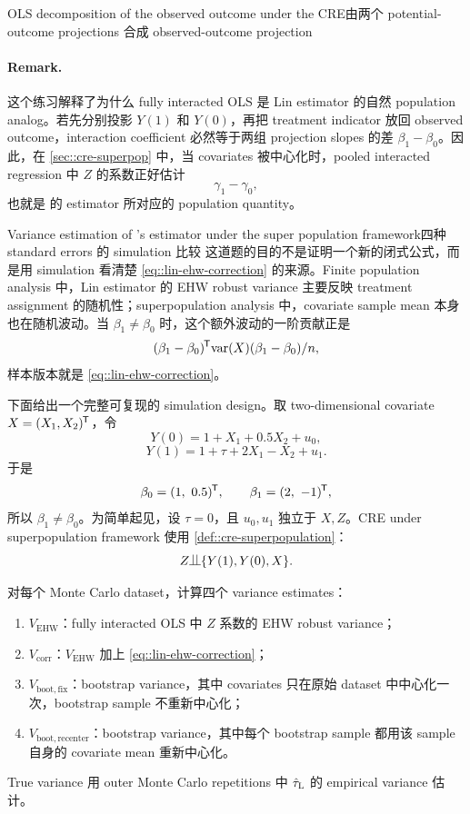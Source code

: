 \begin{exercisesolution}{OLS decomposition of the observed outcome under the CRE}{由两个 potential-outcome projections 合成 observed-outcome projection}
\paragraph{Remark.}
这个练习解释了为什么 fully interacted OLS 是 Lin estimator 的自然 population analog。若先分别投影 $Y(1)$ 和 $Y(0)$，再把 treatment indicator 放回 observed outcome，interaction coefficient 必然等于两组 projection slopes 的差 $\beta_1-\beta_0$。因此，在 \cref{sec::cre-superpop} 中，当 covariates 被中心化时，pooled interacted regression 中 $Z$ 的系数正好估计
\[
\gamma_1-\gamma_0,
\]
也就是 \citet{lin2013} 的 estimator 所对应的 population quantity。
\end{exercisesolution}

\begin{exercisesolution}{Variance estimation of \citet{lin2013}'s estimator under the super population framework}{四种 standard errors 的 simulation 比较}
这道题的目的不是证明一个新的闭式公式，而是用 simulation 看清楚 \cref{eq::lin-ehw-correction} 的来源。Finite population analysis 中，Lin estimator 的 EHW robust variance 主要反映 treatment assignment 的随机性；superpopulation analysis 中，covariate sample mean 本身也在随机波动。当 $\beta_1\neq\beta_0$ 时，这个额外波动的一阶贡献正是
\[
(\beta_1-\beta_0)^{\mkern-1.5mu\mathsf{T}}\text{var}(X)(\beta_1-\beta_0)/n,
\]
样本版本就是 \cref{eq::lin-ehw-correction}。

下面给出一个完整可复现的 simulation design。取 two-dimensional covariate $X=(X_1,X_2)^{\mkern-1.5mu\mathsf{T}}$，令
\[
Y(0)=1+X_1+0.5X_2+u_0,
\]
\[
Y(1)=1+\tau+2X_1-X_2+u_1.
\]
于是
\[
\beta_0=(1,\ 0.5)^{\mkern-1.5mu\mathsf{T}},\qquad
\beta_1=(2,\ -1)^{\mkern-1.5mu\mathsf{T}},
\]
所以 $\beta_1\neq\beta_0$。为简单起见，设 $\tau=0$，且 $u_0,u_1$ 独立于 $X,Z$。CRE under superpopulation framework 使用 \cref{def::cre-superpopulation}：
\[
Z\ind\{Y(1),Y(0),X\}.
\]

对每个 Monte Carlo dataset，计算四个 variance estimates：
\begin{enumerate}
  \item $V_{\mathrm{EHW}}$：fully interacted OLS 中 $Z$ 系数的 EHW robust variance；
  \item $V_{\mathrm{corr}}$：$V_{\mathrm{EHW}}$ 加上 \cref{eq::lin-ehw-correction}；
  \item $V_{\mathrm{boot,fix}}$：bootstrap variance，其中 covariates 只在原始 dataset 中中心化一次，bootstrap sample 不重新中心化；
  \item $V_{\mathrm{boot,recenter}}$：bootstrap variance，其中每个 bootstrap sample 都用该 sample 自身的 covariate mean 重新中心化。
\end{enumerate}
True variance 用 outer Monte Carlo repetitions 中 $\hat\tau_{\textsc{L}}$ 的 empirical variance 估计。


\end{exercisesolution}
